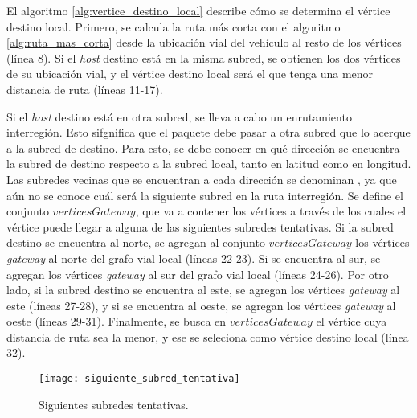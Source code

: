 El algoritmo \ref{alg:vertice_destino_local} describe cómo se determina el
vértice destino local. Primero, se calcula la ruta más corta con el algoritmo
\ref{alg:ruta_mas_corta} desde la ubicación vial del vehículo al resto de los
vértices (línea 8). Si el \textit{host} destino está en la misma subred, se
obtienen los dos vértices de su ubicación vial, y el vértice destino local será
el que tenga una menor distancia de ruta (líneas 11-17).

Si el \textit{host} destino está en otra subred, se lleva a cabo un
enrutamiento interregión. Esto sifgnifica que el paquete debe pasar a otra
subred que lo acerque a la subred de destino. Para esto, se debe conocer en qué
dirección se encuentra la subred de destino respecto a la subred local, tanto
en latitud como en longitud. Las subredes vecinas que se encuentran a cada
dirección se denominan , ya que aún no
se conoce cuál será la siguiente subred en la ruta interregión. Se define el
conjunto $verticesGateway$, que va a contener los vértices a través de los
cuales el vértice puede llegar a alguna de las siguientes subredes tentativas.
Si la subred destino se encuentra al norte, se agregan al conjunto
$verticesGateway$ los vértices \textit{gateway} al norte del grafo vial local
(líneas 22-23). Si se encuentra al sur, se agregan los vértices
\textit{gateway} al sur del grafo vial local (líneas 24-26). Por otro lado, si
la subred destino se encuentra al este, se agregan los vértices
\textit{gateway} al este (líneas 27-28), y si se encuentra al oeste, se agregan
los vértices \textit{gateway} al oeste (líneas 29-31). Finalmente, se busca en
$verticesGateway$ el vértice cuya distancia de ruta sea la menor, y ese se
seleciona como vértice destino local (línea 32).

\begin{figure}[th!]
\centering
\texttt{[image: siguiente\_subred\_tentativa]}
\decoRule
\caption[Siguientes subredes tentativas]{Siguientes subredes tentativas.}
\label{fig:siguiente_subred_tentativa}
\end{figure}

